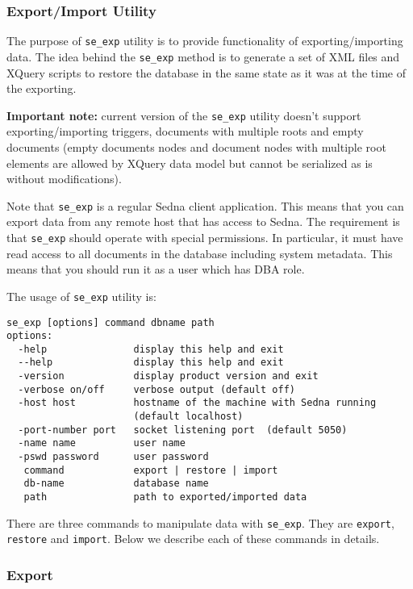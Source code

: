 \documentclass[a4paper,12pt]{article}
\begin{document}
\subsubsection{Export/Import Utility}

The purpose of \verb!se_exp! utility is to provide functionality of
exporting/importing data. The idea behind the \verb!se_exp! method is to
generate a set of XML files and XQuery scripts to restore the database in the
same state as it was at the time of the exporting.

\textbf{Important note:} current version of the \verb!se_exp! utility doesn't
support exporting/importing triggers, documents with multiple roots and empty
documents (empty documents nodes and document nodes with multiple root elements
are allowed by XQuery data model but cannot be serialized as is without
modifications).

Note that \verb!se_exp! is a regular Sedna client application. This means that
you can export data from any remote host that has access to Sedna. The
requirement is that \verb!se_exp! should operate with special permissions. In
particular, it must have read access to all documents in the database including
system metadata. This means that you should run it as a user which has DBA role.

The usage of \verb!se_exp! utility is:

\small{
\begin{verbatim}
se_exp [options] command dbname path
options:
  -help               display this help and exit
  --help              display this help and exit
  -version            display product version and exit
  -verbose on/off     verbose output (default off)
  -host host          hostname of the machine with Sedna running
                      (default localhost)
  -port-number port   socket listening port  (default 5050)
  -name name          user name
  -pswd password      user password
   command            export | restore | import
   db-name            database name
   path               path to exported/imported data
\end{verbatim}}

There are three commands to manipulate data with \verb!se_exp!. They are
\verb!export!, \verb!restore! and \verb!import!. Below we describe each of these
commands in details.


\subsubsection*{Export}
\end{document}

